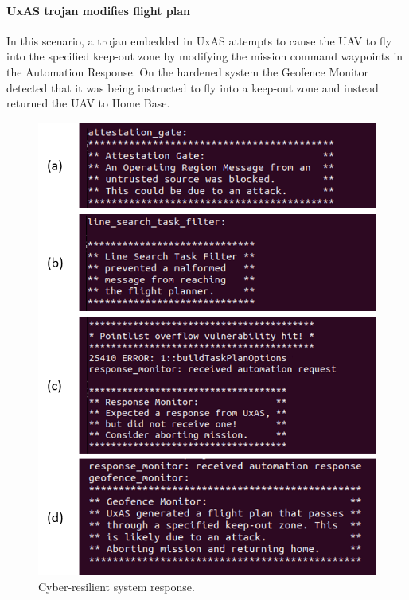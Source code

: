 \paragraph{UxAS trojan modifies flight plan} In this scenario, a trojan embedded in UxAS attempts to cause the UAV to fly into the specified keep-out zone by modifying the mission command waypoints in the Automation Response.  
On the hardened system the Geofence Monitor detected that it was being instructed to fly into a keep-out zone and instead returned the UAV to Home Base.


\begin{figure}[h]
	\centering
	\includegraphics[width=0.8\columnwidth]{figs/mitigation-output.png}
	\caption{Cyber-resilient system response.} 
	\label{fig:mitigation-output} 
\end{figure}


